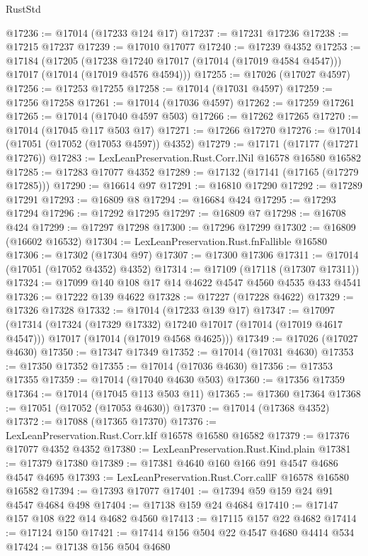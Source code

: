 \begin{lexlean}{RustStd}
\begin{coremodule}
@17236 := @17014 (@17233 @124 @17)
@17237 := @17231 @17236
@17238 := @17215 @17237
@17239 := @17010 @17077
@17240 := @17239 @4352
@17253 := @17184
    (@17205
      (@17238 @17240 @17017 (@17014 (@17019 @4584 @4547)))
      @17017
      (@17014 (@17019 @4576 @4594)))
@17255 := @17026 (@17027 @4597)
@17256 := @17253 @17255
@17258 := @17014 (@17031 @4597)
@17259 := @17256 @17258
@17261 := @17014 (@17036 @4597)
@17262 := @17259 @17261
@17265 := @17014 (@17040 @4597 @503)
@17266 := @17262 @17265
@17270 := @17014 (@17045 @117 @503 @17)
@17271 := @17266 @17270
@17276 := @17014 (@17051 (@17052 (@17053 @4597)) @4352)
@17279 := @17171 (@17177 (@17271 @17276))
@17283 := LexLeanPreservation.Rust.Corr.lNil @16578 @16580 @16582
@17285 := @17283 @17077 @4352
@17289 := @17132 (@17141 (@17165 (@17279 @17285)))
@17290 := @16614 @97
@17291 := @16810 @17290
@17292 := @17289 @17291
@17293 := @16809 @8
@17294 := @16684 @424
@17295 := @17293 @17294
@17296 := @17292 @17295
@17297 := @16809 @7
@17298 := @16708 @424
@17299 := @17297 @17298
@17300 := @17296 @17299
@17302 := @16809 (@16602 @16532)
@17304 := LexLeanPreservation.Rust.fnFallible @16580
@17306 := @17302 (@17304 @97)
@17307 := @17300 @17306
@17311 := @17014 (@17051 (@17052 @4352) @4352)
@17314 := @17109 (@17118 (@17307 @17311))
@17324 := @17099 @140 @108 @17 @14 @4622 @4547 @4560 @4535 @433 @4541
@17326 := @17222 @139 @4622
@17328 := @17227 (@17228 @4622)
@17329 := @17326 @17328
@17332 := @17014 (@17233 @139 @17)
@17347 := @17097
    (@17314
      (@17324 (@17329 @17332) @17240 @17017 (@17014 (@17019 @4617 @4547)))
      @17017
      (@17014 (@17019 @4568 @4625)))
@17349 := @17026 (@17027 @4630)
@17350 := @17347 @17349
@17352 := @17014 (@17031 @4630)
@17353 := @17350 @17352
@17355 := @17014 (@17036 @4630)
@17356 := @17353 @17355
@17359 := @17014 (@17040 @4630 @503)
@17360 := @17356 @17359
@17364 := @17014 (@17045 @113 @503 @11)
@17365 := @17360 @17364
@17368 := @17051 (@17052 (@17053 @4630))
@17370 := @17014 (@17368 @4352)
@17372 := @17088 (@17365 @17370)
@17376 := LexLeanPreservation.Rust.Corr.kIf @16578 @16580 @16582
@17379 := @17376 @17077 @4352 @4352
@17380 := LexLeanPreservation.Rust.Kind.plain
@17381 := @17379 @17380
@17389 := @17381 @4640 @160 @166 @91 @4547 @4686 @4547 @4695
@17393 := LexLeanPreservation.Rust.Corr.callF @16578 @16580 @16582
@17394 := @17393 @17077
@17401 := @17394 @59 @159 @24 @91 @4547 @4684 @498
@17404 := @17138 @159 @24 @4684
@17410 := @17147 @157 @108 @22 @14 @4682 @4560
@17413 := @17115 @157 @22 @4682
@17414 := @17124 @150
@17421 := @17414 @156 @504 @22 @4547 @4680 @4414 @534
@17424 := @17138 @156 @504 @4680

\end{coremodule}
\end{lexlean}
